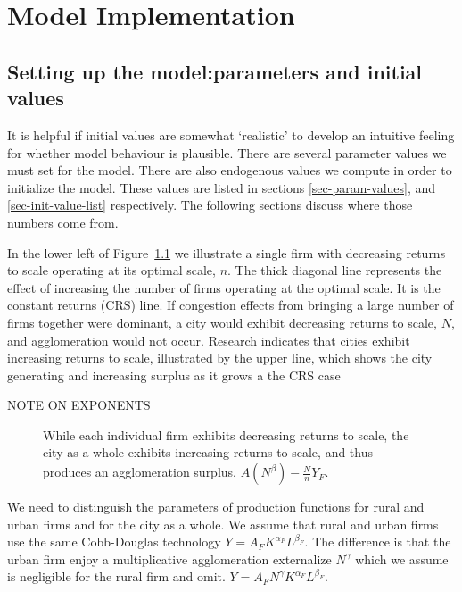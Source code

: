 \chapter[Model Implementation]{Model Implementation}

\section{Setting up the model:\newline parameters and initial values}
It is helpful if initial values are somewhat `realistic' to develop an intuitive feeling for whether model behaviour is plausible. 
There are several parameter values we must set for the model. There are also endogenous values we compute in order to initialize the model. These values are listed in sections \ref{sec-param-values}, and \ref{sec-init-value-list} respectively. The following sections discuss where those numbers come from. %

In the lower left of Figure~\ref{fig:Agglomeration-surplus}  we illustrate a single firm with decreasing returns to scale operating at its optimal scale, $n$. The thick diagonal line represents the effect of  increasing the number of firms operating at the optimal scale. It is the constant returns (CRS) line. If congestion effects from bringing a large number of firms together were dominant, a city would exhibit decreasing returns to  scale,  $N$, and agglomeration would not occur. Research indicates that cities exhibit increasing returns to scale, illustrated by the upper line, which shows the city generating and increasing surplus as it grows a the CRS case

NOTE ON EXPONENTS

\begin{figure}[htb]
    \centering

    \caption{While each individual firm exhibits decreasing returns to scale, the city as a whole exhibits increasing returns to scale, and thus produces an agglomeration surplus, $A(N^\beta)-\frac{N}{n}Y_F$.}
    \label{fig:Agglomeration-surplus}
\end{figure}

We need to distinguish the parameters of production functions for rural and urban firms and for the city as a whole. We assume that  rural and  urban firms use the same Cobb-Douglas technology $Y=A_FK^{\alpha_F}L^{\beta_F}$. The difference is that the urban firm enjoy a  multiplicative agglomeration externalize $N^\gamma$ which we assume is negligible for the rural firm and omit. $Y=A_FN^\gamma  K^{\alpha_F}L^{\beta_F}$.

